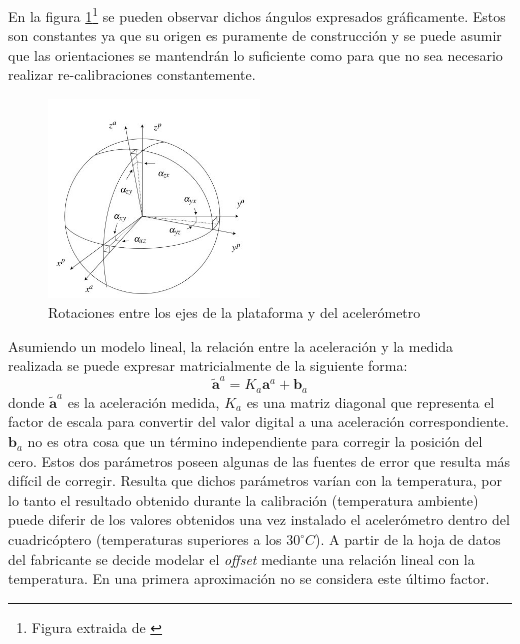 \documentclass[main]{subfiles}
\begin{document}
En la figura \ref{fig:ejes}\footnote{Figura extraida de \cite{bib:calib_IMU}} se pueden observar dichos \'angulos expresados gr\'aficamente. Estos son constantes ya que su origen es puramente de construcción y se puede asumir que las orientaciones se mantendrán lo suficiente como para que no sea necesario realizar re-calibraciones constantemente.\\
\begin{figure}
  \vspace{-20pt}
  \begin{center}
    \includegraphics[width=0.5\textwidth]{./pics_acc/ejes_acc.jpg}
  \end{center}
  \vspace{-20pt}
  \caption{Rotaciones entre los ejes de la plataforma y del acelerómetro}
  \label{fig:ejes}
  \vspace{-10pt}
\end{figure}



Asumiendo un modelo lineal, la relación entre la aceleración y la medida realizada se puede expresar matricialmente de la siguiente forma:
\begin{equation}
\tilde{\mathbf{a}}^a = K_a \mathbf{a}^a + \mathbf{b}_a
\end{equation} donde $\tilde{\mathbf{a}}^a$ es la aceleraci\'on medida, $K_a$ es una matriz diagonal que representa el factor de escala para convertir del valor digital a una aceleración correspondiente. $\mathbf{b}_a$ no es otra cosa que un término independiente para corregir la posición del cero. Estos dos parámetros poseen algunas de las fuentes de error que resulta más difícil de corregir. Resulta que dichos parámetros varían con la temperatura, por lo tanto el resultado obtenido durante la calibraci\'on (temperatura ambiente) puede diferir de los valores obtenidos una vez instalado el aceler\'ometro dentro del cuadric\'optero (temperaturas superiores a los $30^\circ C$). A partir de la hoja de datos del fabricante se decide modelar el \emph{offset} mediante una relaci\'on lineal con la temperatura. En una primera aproximaci\'on no se considera este \'ultimo factor.
\end{document}
